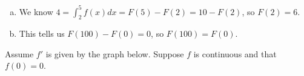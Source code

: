 \documentclass[11pt]{exam}
\begin{document}
\begin{questions}
  \begin{solution}
    \begin{enumerate}[(a)]
    \item We know \(4 = \int_2^5 f(x) dx = F(5)-F(2) = 10-F(2)\), so
      \(F(2) = 6\).
    \item This tells us \(F(100)-F(0) = 0\), so \(F(100) = F(0)\).
    \end{enumerate}
  \end{solution}
\question Assume \(f'\) is given by the graph below. Suppose \(f\) is
  continuous and that \(f(0) = 0\). 


\end{questions}
\end{document}
